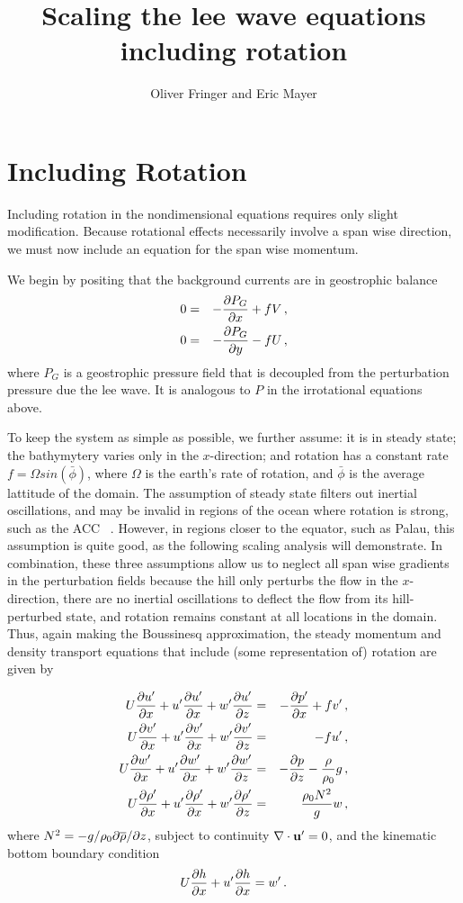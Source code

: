 \documentclass[12pt]{article}
\begin{document}
	
	\title{Scaling the lee wave equations including rotation}
	
	\author{Oliver Fringer and Eric Mayer}
	
	\maketitle

\section{Including Rotation}
Including rotation in the nondimensional equations requires only slight modification. Because rotational effects necessarily involve a span wise direction, we must now include an equation for the span wise momentum. 

We begin by positing that the background currents are in geostrophic balance
\begin{eqnarray*}
	0 &=& -\frac{\partial{P_G}}{\partial{x}} + fV \,,\\
	0 &=& -\frac{\partial{P_G}}{\partial{y}} - fU \,,\\
\end{eqnarray*}
where $P_G$ is a geostrophic pressure field that is decoupled from the perturbation pressure due the lee wave. It is analogous to $P$ in the irrotational equations above.
	

To keep the system as simple as possible, we further assume: it is in steady state; the bathymytery varies only in the $x$-direction; and rotation has a constant rate $f=\Omega sin(\bar{\phi})$, where $\Omega$ is the earth's rate of rotation, and $\bar{\phi}$ is the average lattitude of the domain. The assumption of steady state filters out inertial oscillations, and may be invalid in regions of the ocean where rotation is strong, such as the ACC ~\citep{Nikurashin2010a}. However, in regions closer to the equator, such as Palau, this assumption is quite good, as the following scaling analysis will demonstrate.  In combination, these three assumptions allow us to neglect all span wise gradients in the perturbation fields because the hill only perturbs the flow in the $x$-direction, there are no inertial oscillations to deflect the flow from its hill-perturbed state, and rotation remains constant at all locations in the domain. Thus, again making the Boussinesq approximation, the steady momentum and density transport equations that include (some representation of) rotation are given by

\begin{eqnarray*}
U \frac{\partial{u'}}{\partial{x}} +u' \frac{\partial{u'}}{\partial{x}} + w' \frac{\partial{u'}}{\partial{z}} &=& -\frac{\partial{p'}}{\partial{x}} + fv' \,,\\
U \frac{\partial{v'}}{\partial{x}} + u' \frac{\partial{v'}}{\partial{x}} + w' \frac{\partial{v'}}{\partial{z}} &=& - fu' \,,\\
U \frac{\partial{w'}}{\partial{x}} + u' \frac{\partial{w'}}{\partial{x}} + w' \frac{\partial{w'}}{\partial{z}} &=& -\frac{\partial{p}}{\partial{z}} - \frac{\rho}{\rho_0} g \,,\\
U \frac{\partial{\rho'}}{\partial{x}} + u' \frac{\partial{\rho'}}{\partial{x}} + w' \frac{\partial{\rho'}}{\partial{z}} &=& \frac{\rho_0 N^2}{g} w\,,
\end{eqnarray*}
where $N^2 = -g/\rho_0 \partial\overline{\rho}/\partial z$, subject to continuity $\nabla\cdot\mathbf{u}'=0$, and
the kinematic bottom boundary condition
\[
U\frac{\partial{h}}{\partial{x}} + u' \frac{\partial{h}}{\partial{x}} = w'\,.
\]  
\end{document}
